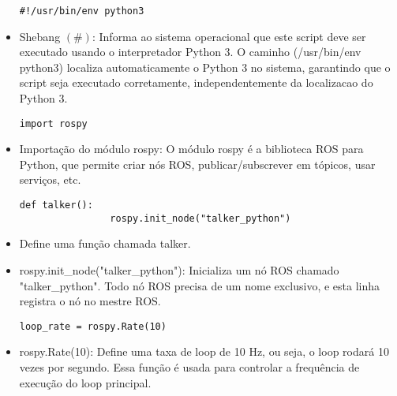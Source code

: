 \documentclass[letterpaper]{article}
\begin{document}
        \begin{itemize}
            
            \begin{lstlisting}[style=pythonStyle, title= Codigo]
              #!/usr/bin/env python3
            \end{lstlisting}
            
            \item Shebang $(\#\!)$: Informa ao sistema operacional que este script deve ser executado usando o interpretador Python 3. O caminho (/usr/bin/env python3) localiza automaticamente o Python 3 no sistema, garantindo que o script seja executado corretamente, independentemente da localizacao do Python 3.
    
            \begin{lstlisting}[style=pythonStyle, title= importacao]
              import rospy
            \end{lstlisting}
            
            \item Importação do módulo rospy: O módulo rospy é a biblioteca ROS para Python, que permite criar nós ROS, publicar/subscrever em tópicos, usar serviços, etc.
            
            
            \begin{lstlisting}[style=pythonStyle, title= Função talker]
                def talker():
                rospy.init_node("talker_python")
            \end{lstlisting}
            \item Define uma função chamada talker.
            
            \item rospy.init\_node("talker\_python"): Inicializa um nó ROS chamado "talker\_python". Todo nó ROS precisa de um nome exclusivo, e esta linha registra o nó no mestre ROS.
            
            \begin{lstlisting}[style=pythonStyle, title= loop principal]
                 loop_rate = rospy.Rate(10) 
            \end{lstlisting}
            
            \item rospy.Rate(10): Define uma taxa de loop de 10 Hz, ou seja, o loop rodará 10 vezes por segundo. Essa função é usada para controlar a frequência de execução do loop principal.
            

\end{itemize}
\end{document}
